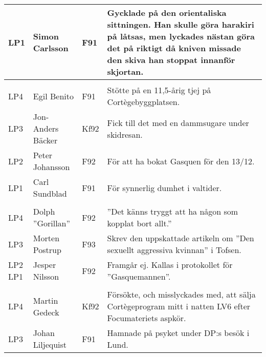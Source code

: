 \documentclass[a4paper]{article}
\begin{document}
\begin{longtable}{p{5mm}>{\raggedright\arraybackslash}p{30mm}p{10mm}p{108mm}}
LP1 & Simon Carlsson & F91 & Gycklade på den orientaliska sittningen. Han skulle göra harakiri på låtsas, men lyckades nästan göra det på riktigt då kniven missade den skiva han stoppat innanför skjortan. \\ \hline

\rowcolor{veryLightGray} \multicolumn{4}{l}{\textbf{1994/1995}} \\ \hline

LP4 & Egil Benito & F91 & Stötte på en 11,5-årig tjej på Cortègebyggplatsen. \\ \hline

LP3 & Jon-Anders Bäcker & Kf92 & Fick till det med en dammsugare under skidresan. \\ \hline

LP2 & Peter Johansson & F92 & För att ha bokat Gasquen för den 13/12. \\ \hline

LP1 & Carl Sundblad & F91 & För synnerlig dumhet i valtider. \\ \hline

\rowcolor{veryLightGray} \multicolumn{4}{l}{\textbf{1993/1994}} \\ \hline

LP4 & Dolph ''Gorillan'' & F92 & ''Det känns tryggt att ha någon som kopplat bort allt.'' \\ \hline

LP3 & Morten Postrup & F93 & Skrev den uppskattade artikeln om ''Den sexuellt aggressiva kvinnan'' i Tofsen. \\ \hline %

\makecell{LP2 \\ LP1} & Jesper Nilsson & F92 & Framgår ej. Kallas i protokollet för ''Gasquemannen''. \\ \hline

\rowcolor{veryLightGray} \multicolumn{4}{l}{\textbf{1992/1993}} \\ \hline

LP4 & Martin Gedeck & Kf92 & Försökte, och misslyckades med, att sälja Cortègeprogram mitt i natten LV6 efter Focumateriets aspkör. \\ \hline

LP3 & Johan Liljequist & F91 & Hamnade på psyket under DP:s besök i Lund. \\ \hline


\end{longtable}
\end{document}
